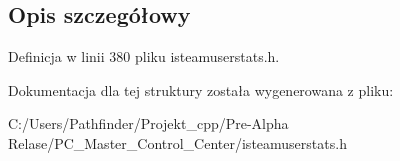 \subsection{Opis szczegółowy}


Definicja w linii 380 pliku isteamuserstats.\+h.



Dokumentacja dla tej struktury została wygenerowana z pliku\+:\begin{DoxyCompactItemize}
\item 
C\+:/\+Users/\+Pathfinder/\+Projekt\+\_\+cpp/\+Pre-\/\+Alpha Relase/\+P\+C\+\_\+\+Master\+\_\+\+Control\+\_\+\+Center/isteamuserstats.\+h\end{DoxyCompactItemize}
